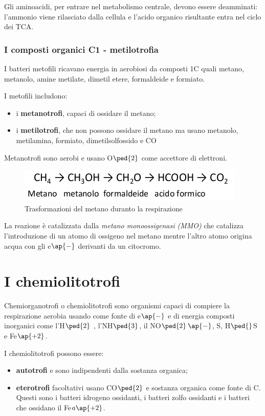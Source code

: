 \documentclass[11pt]{book}
\begin{document}
Gli aminoacidi, per entrare nel metabolismo centrale, devono essere deamminati: l’ammonio viene rilasciato dalla cellula e l’acido organico risultante entra nel ciclo dei TCA.

\subsubsection{I composti organici C1 - metilotrofia}
I batteri metofili ricavano energia in aerobiosi da composti 1C quali metano, metanolo, amine metilate, dimetil etere, formaldeide e formiato. 

I metofili includono: 
\begin{itemize}
\item i \textbf{metanotrofi}, capaci di ossidare il metano;
\item i \textbf{metilotrofi}, che non possono ossidare il metano ma usano metanolo, metilamina, formiato, dimetilsolfossido e CO 
\end{itemize}

Metanotrofi sono aerobi e usano O$\ped{2}$ come accettore di elettroni.

\begin{figure}[htp]
\centering
\includegraphics[scale=0.5]{img/Passaggi metilotrofia.png}
\caption{Trasformazioni del metano duranto la respirazione}
\label{}
\end{figure}


La reazione è catalizzata dalla \emph{metano monoossigenasi (MMO)} che catalizza l’introduzione di un atomo di ossigeno nel metano mentre l’altro atomo origina acqua con gli e$\ap{-}$ derivanti da un citocromo.

\clearpage
\section{I chemiolitotrofi}
Chemiorganotrofi o chemiolitotrofi sono organismi capaci di compiere la respirazione aerobia usando come fonte di e$\ap{-}$ e di energia composti inorganici come l’H$\ped{2}$ , l’NH$\ped{3}$, il NO$\ped{2}$$\ap{-}$, S, H$\ped{}$S e Fe$\ap{+2}$. 

I chemiolitotrofi possono essere:
\begin{itemize}
\item \textbf{autotrofi} e sono indipendenti dalla sostanza organica;
\item \textbf{eterotrofi} facoltativi usano CO$\ped{2}$ e sostanza organica come fonte di C. Questi sono i batteri idrogeno ossidanti, i batteri zolfo ossidanti e i batteri che ossidano il Fe$a\ap{+2}$.
\end{itemize}
\end{document}
